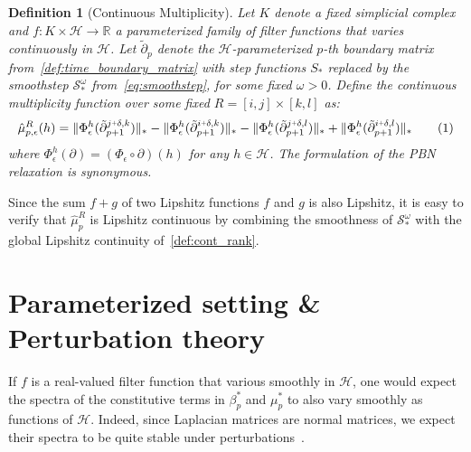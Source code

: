 \documentclass[10pt]{article}
\numberwithin{equation}{section}
\newcommand{\+}{%
	\raisebox{0.18ex}{\scaleobj{0.55}{+}}
}
\newtheorem{definition}{Definition}
\newtheorem{corollary}{Corollary}
\theoremstyle{definition}
\newcommand\numberthis{\addtocounter{equation}{1}\tag{\theequation}}
\begin{document}
\begin{definition}[Continuous Multiplicity]
Let $K$ denote a fixed simplicial complex and $f: K \times \mathcal{H} \to \mathbb{R}$ a parameterized family of filter functions that varies continuously in $\mathcal{H}$. Let $\tilde{\partial}_p$ denote the $\mathcal{H}$-parameterized $p$-th boundary matrix from~\ref{def:time_boundary_matrix} with step functions $S_\ast$ replaced by the smoothstep $\mathcal{S}_\ast^\omega$ from~\eqref{eq:smoothstep}, for some fixed $\omega > 0$. Define the \emph{continuous multiplicity function} over some fixed $R = [i,j] \times [k,l]$ as:
	\begin{equation}\label{eq:mu_cont}
	\hat{\mu}_{p,\epsilon}^R(h) = 
		 \lVert \Phi_\epsilon^h(\tilde{\partial}_{p+1}^{j \+ \delta, k}) \rVert_\ast - 
		 \lVert \Phi_\epsilon^h(\tilde{\partial}_{p+1}^{i \+ \delta, k}) \rVert_\ast -  
		 \lVert \Phi_\epsilon^h(\tilde{\partial}_{p+1}^{j \+ \delta, l}) \rVert_\ast + 
		 \lVert \Phi_\epsilon^h(\tilde{\partial}_{p+1}^{i \+ \delta, l}) \rVert_\ast \numberthis
\end{equation}
where $\Phi_\epsilon^h(\partial) = (\Phi_\epsilon \circ \partial)(h)$ for any $h \in \mathcal{H}$. The formulation of the PBN relaxation is synonymous.
\end{definition}
\noindent Since the sum $f + g$ of two Lipshitz functions $f$ and $g$ is also Lipshitz, it is easy to verify that $\hat{\mu}_p^R$ is Lipshitz continuous by combining the smoothness of $\mathcal{S}_\ast^\omega$ with the global Lipshitz continuity of~\eqref{def:cont_rank}. 





\section{Parameterized setting \& Perturbation theory}
If $f$ is a real-valued filter function that various smoothly in $\mathcal{H}$, one would expect the spectra of the constitutive terms in $\beta_p^\ast$ and $\mu_p^\ast$ to also vary smoothly as functions of $\mathcal{H}$.
Indeed, since Laplacian matrices are normal matrices, we expect their spectra to be quite stable under perturbations~\cite{}. 
\end{document}
